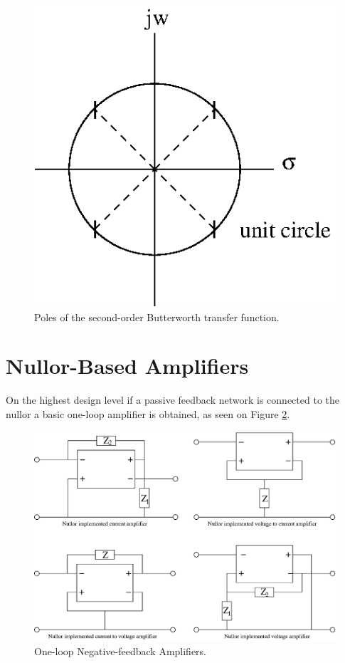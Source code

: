 \documentclass[conference]{IEEEtran}
\begin{document}
\begin{figure}[hbtp]
	\centering
	\includegraphics[scale=.7]{figures/second_ord_butterworth.eps}
	\caption{Poles of the second-order Butterworth transfer function.}
	\label{fig:second_butterworth}
\end{figure}


\section{Nullor-Based Amplifiers}
On the highest design level if a passive feedback network is connected to the nullor a basic one-loop amplifier is obtained, as seen on Figure \ref{fig:one_loop}.

\begin{figure}[hbtp]
	\centering
	\includegraphics[scale=.4]{figures/nullor_grouped.eps}
	\caption{One-loop Negative-feedback Amplifiers.}
	\label{fig:one_loop}
\end{figure}
 
\end{document}
